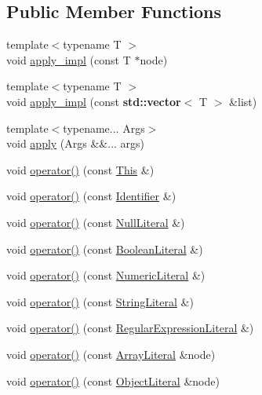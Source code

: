 \subsection*{Public Member Functions}
\begin{DoxyCompactItemize}
\item 
{\footnotesize template$<$typename T $>$ }\\void \hyperlink{struct_basic_visitor_aef8aa82a7e5149b6153f097af8daa647}{apply\+\_\+impl} (const T $\ast$node)
\item 
{\footnotesize template$<$typename T $>$ }\\void \hyperlink{struct_basic_visitor_a128388a75069690c9c108ce87b69cde8}{apply\+\_\+impl} (const \textbf{ std\+::vector}$<$ T $>$ \&list)
\item 
{\footnotesize template$<$typename... Args$>$ }\\void \hyperlink{struct_basic_visitor_a85afee760b9e02733ed01ff56a96f09c}{apply} (Args \&\&... args)
\item 
void \hyperlink{struct_basic_visitor_a80dd293b132b869b59f1b87446a86354}{operator()} (const \hyperlink{struct_this}{This} \&)
\item 
void \hyperlink{struct_basic_visitor_aa63b7795f0c0cf27fd01dd36d9cc6cbe}{operator()} (const \hyperlink{struct_identifier}{Identifier} \&)
\item 
void \hyperlink{struct_basic_visitor_a55220c3af28e07f5890189f076032606}{operator()} (const \hyperlink{struct_null_literal}{Null\+Literal} \&)
\item 
void \hyperlink{struct_basic_visitor_ae4b099b2e6e3ef9cbad353c9f3e2d270}{operator()} (const \hyperlink{struct_boolean_literal}{Boolean\+Literal} \&)
\item 
void \hyperlink{struct_basic_visitor_a15a06a03234489bef8e938b3c12bc9ed}{operator()} (const \hyperlink{struct_numeric_literal}{Numeric\+Literal} \&)
\item 
void \hyperlink{struct_basic_visitor_a01233533d2401acfe3f2f93cb2e3a051}{operator()} (const \hyperlink{struct_string_literal}{String\+Literal} \&)
\item 
void \hyperlink{struct_basic_visitor_ab1df85c3eb4de916d811221a9ded9c2f}{operator()} (const \hyperlink{struct_regular_expression_literal}{Regular\+Expression\+Literal} \&)
\item 
void \hyperlink{struct_basic_visitor_a90dbd5cdf8d01591b35b1cfd17086758}{operator()} (const \hyperlink{struct_array_literal}{Array\+Literal} \&node)
\item 
void \hyperlink{struct_basic_visitor_a56f91fbcd7685332d5d22147ed8ac385}{operator()} (const \hyperlink{struct_object_literal}{Object\+Literal} \&node)

\end{DoxyCompactItemize}
